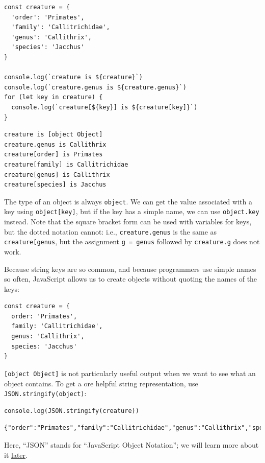\begin{verbatim}
const creature = {
  'order': 'Primates',
  'family': 'Callitrichidae',
  'genus': 'Callithrix',
  'species': 'Jacchus'
}

console.log(`creature is ${creature}`)
console.log(`creature.genus is ${creature.genus}`)
for (let key in creature) {
  console.log(`creature[${key}] is ${creature[key]}`)
}
\end{verbatim}

\begin{verbatim}
creature is [object Object]
creature.genus is Callithrix
creature[order] is Primates
creature[family] is Callitrichidae
creature[genus] is Callithrix
creature[species] is Jacchus
\end{verbatim}

The type of an object is always \texttt{object}. We can get the value
associated with a key using \texttt{object{[}key{]}}, but if the key has
a simple name, we can use \texttt{object.key} instead. Note that the
square bracket form can be used with variables for keys, but the dotted
notation cannot: i.e., \texttt{creature.genus} is the same as
\texttt{creature{[}\textquotesingle{}genus\textquotesingle{}{]}}, but
the assignment \texttt{g\ =\ \textquotesingle{}genus\textquotesingle{}}
followed by \texttt{creature.g} does not work.

Because string keys are so common, and because programmers use simple
names so often, JavaScript allows us to create objects without quoting
the names of the keys:

\begin{verbatim}
const creature = {
  order: 'Primates',
  family: 'Callitrichidae',
  genus: 'Callithrix',
  species: 'Jacchus'
}
\end{verbatim}

\texttt{{[}object\ Object{]}} is not particularly useful output when we
want to see what an object contains. To get a ore helpful string
representation, use \texttt{JSON.stringify(object)}:

\begin{verbatim}
console.log(JSON.stringify(creature))
\end{verbatim}

\begin{verbatim}
{"order":"Primates","family":"Callitrichidae","genus":"Callithrix","species":"Jacchus"}
\end{verbatim}

Here, ``JSON'' stands for ``JavaScript Object Notation''; we will learn
more about it \protect\hyperlink{s:dataman}{later}.


